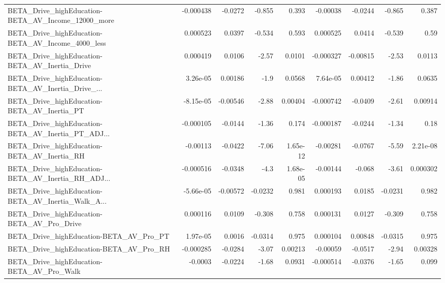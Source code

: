 \begin{tabular}{lrrrrrrrr}
BETA\_Drive\_highEducation-BETA\_AV\_Income\_12000\_more &   -0.000438 &      -0.0272 &   -0.855 &    0.393 &   -0.00038 &     -0.0244 &       -0.865 &         0.387 \\
BETA\_Drive\_highEducation-BETA\_AV\_Income\_4000\_less  &    0.000523 &       0.0397 &   -0.534 &    0.593 &   0.000525 &      0.0414 &       -0.539 &          0.59 \\
BETA\_Drive\_highEducation-BETA\_AV\_Inertia\_Drive     &    0.000419 &       0.0106 &    -2.57 &   0.0101 &  -0.000327 &    -0.00815 &        -2.53 &        0.0113 \\
BETA\_Drive\_highEducation-BETA\_AV\_Inertia\_Drive\_... &    3.26e-05 &      0.00186 &     -1.9 &   0.0568 &   7.64e-05 &     0.00412 &        -1.86 &        0.0635 \\
BETA\_Drive\_highEducation-BETA\_AV\_Inertia\_PT        &   -8.15e-05 &     -0.00546 &    -2.88 &  0.00404 &  -0.000742 &     -0.0409 &        -2.61 &       0.00914 \\
BETA\_Drive\_highEducation-BETA\_AV\_Inertia\_PT\_ADJ... &   -0.000105 &      -0.0144 &    -1.36 &    0.174 &  -0.000187 &     -0.0244 &        -1.34 &          0.18 \\
BETA\_Drive\_highEducation-BETA\_AV\_Inertia\_RH        &    -0.00113 &      -0.0422 &    -7.06 & 1.65e-12 &   -0.00281 &     -0.0767 &        -5.59 &      2.21e-08 \\
BETA\_Drive\_highEducation-BETA\_AV\_Inertia\_RH\_ADJ... &   -0.000516 &      -0.0348 &     -4.3 & 1.68e-05 &   -0.00144 &      -0.068 &        -3.61 &      0.000302 \\
BETA\_Drive\_highEducation-BETA\_AV\_Inertia\_Walk\_A... &   -5.66e-05 &     -0.00572 &  -0.0232 &    0.981 &   0.000193 &      0.0185 &      -0.0231 &         0.982 \\
BETA\_Drive\_highEducation-BETA\_AV\_Pro\_Drive         &    0.000116 &       0.0109 &   -0.308 &    0.758 &   0.000131 &      0.0127 &       -0.309 &         0.758 \\
BETA\_Drive\_highEducation-BETA\_AV\_Pro\_PT            &    1.97e-05 &       0.0016 &  -0.0314 &    0.975 &   0.000104 &     0.00848 &      -0.0315 &         0.975 \\
BETA\_Drive\_highEducation-BETA\_AV\_Pro\_RH            &   -0.000285 &      -0.0284 &    -3.07 &  0.00213 &   -0.00059 &     -0.0517 &        -2.94 &       0.00328 \\
BETA\_Drive\_highEducation-BETA\_AV\_Pro\_Walk          &     -0.0003 &      -0.0224 &    -1.68 &   0.0931 &  -0.000514 &     -0.0376 &        -1.65 &         0.099 \\

\end{tabular}

